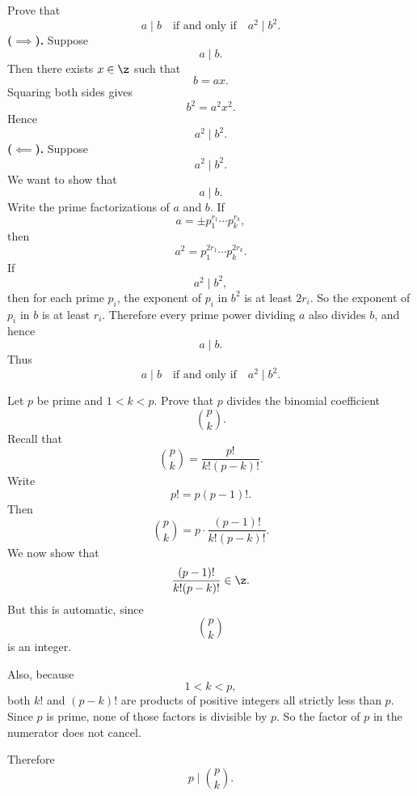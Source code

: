 \begin{problem}{
    Prove that
    \[
        a\mid b
        \quad\text{if and only if}\quad
        a^2\mid b^2.
    \]
}
    \textbf{($\implies$).}
    Suppose
    \[
        a\mid b.
    \]
    Then there exists $x\in\z$ such that
    \[
        b=ax.
    \]
    Squaring both sides gives
    \[
        b^2=a^{2}x^2.
    \]
    Hence
    \[
        a^2\mid b^2.
    \]
    \textbf{($\impliedby$).}
    Suppose
    \[
        a^2\mid b^2.
    \]
    We want to show that
    \[
        a\mid b.
    \]
    Write the prime factorizations of $a$ and $b$.
    If
    \[
        a=\pm p_1^{r_1}\cdots p_k^{r_k},
    \]
    then
    \[
        a^2=p_1^{2r_1}\cdots p_k^{2r_k}.
    \]
    If
    \[
        a^2\mid b^2,
    \]
    then for each prime $p_i$, the exponent of $p_i$ in $b^2$ is at least $2r_i$.
    So the exponent of $p_i$ in $b$ is at least $r_i$.
    Therefore every prime power dividing $a$ also divides $b$, and hence
    \[
        a\mid b.
    \]
    Thus
    \[
        a\mid b
        \quad\text{if and only if}\quad
        a^2\mid b^2.
    \]
\end{problem}

\begin{problem}{
    Let $p$ be prime and $1<k<p$.
    Prove that $p$ divides the binomial coefficient
    \[
        \binom{p}{k}.
    \]
}
    Recall that
    \[
        \binom{p}{k}=\frac{p!}{k!(p-k)!}.
    \]
    Write
    \[
        p!=p(p-1)!.
    \]
    Then
    \[
        \binom{p}{k}=p\cdot \frac{(p-1)!}{k!(p-k)!}.
    \]
    We now show that
    \[
        \frac{(p-1)!}{k!(p-k)!}\in\z.
    \]
    But this is automatic, since
    \[
        \binom{p}{k}
    \]
    is an integer.

    Also, because
    \[
        1<k<p,
    \]
    both $k!$ and $(p-k)!$ are products of positive integers all strictly less than $p$.
    Since $p$ is prime, none of those factors is divisible by $p$.
    So the factor of $p$ in the numerator does not cancel.

    Therefore
    \[
        p\mid \binom{p}{k}.
    \]
\end{problem}

